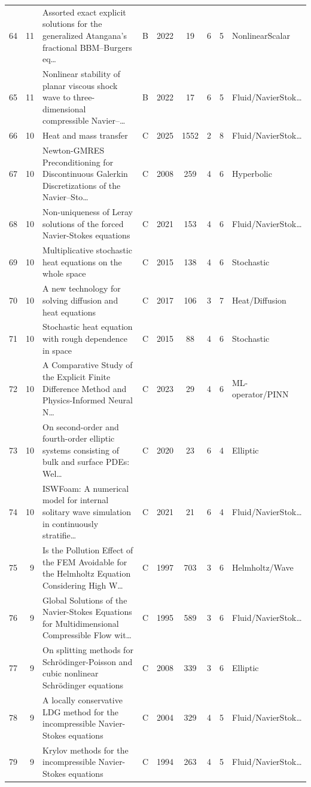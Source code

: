 \documentclass[10pt,letterpaper]{article}
\begin{document}
\begin{center}
\begin{longtable}{rrp{}cccccp{}}
64 & 11 & Assorted exact explicit solutions for the generalized Atangana’s fractional BBM–Burgers eq… & B & 2022 & 19 & 6 & 5 & NonlinearScalar \\
65 & 11 & Nonlinear stability of planar viscous shock wave to three-dimensional compressible Navier–… & B & 2022 & 17 & 6 & 5 & Fluid/NavierStok… \\
66 & 10 & Heat and mass transfer & C & 2025 & 1552 & 2 & 8 & Fluid/NavierStok… \\
67 & 10 & Newton-GMRES Preconditioning for Discontinuous Galerkin Discretizations of the Navier--Sto… & C & 2008 & 259 & 4 & 6 & Hyperbolic \\
68 & 10 & Non-uniqueness of Leray solutions of the forced Navier-Stokes equations & C & 2021 & 153 & 4 & 6 & Fluid/NavierStok… \\
69 & 10 & Multiplicative stochastic heat equations on the whole space & C & 2015 & 138 & 4 & 6 & Stochastic \\
70 & 10 & A new technology for solving diffusion and heat equations & C & 2017 & 106 & 3 & 7 & Heat/Diffusion \\
71 & 10 & Stochastic heat equation with rough dependence in space & C & 2015 & 88 & 4 & 6 & Stochastic \\
72 & 10 & A Comparative Study of the Explicit Finite Difference Method and Physics-Informed Neural N… & C & 2023 & 29 & 4 & 6 & ML-operator/PINN \\
73 & 10 & On second-order and fourth-order elliptic systems consisting of bulk and surface PDEs: Wel… & C & 2020 & 23 & 6 & 4 & Elliptic \\
74 & 10 & ISWFoam: A numerical model for internal solitary wave simulation in continuously stratifie… & C & 2021 & 21 & 6 & 4 & Fluid/NavierStok… \\
75 & 9 & Is the Pollution Effect of the FEM Avoidable for the Helmholtz Equation Considering High W… & C & 1997 & 703 & 3 & 6 & Helmholtz/Wave \\
76 & 9 & Global Solutions of the Navier-Stokes Equations for Multidimensional Compressible Flow wit… & C & 1995 & 589 & 3 & 6 & Fluid/NavierStok… \\
77 & 9 & On splitting methods for Schrödinger-Poisson and cubic nonlinear Schrödinger equations & C & 2008 & 339 & 3 & 6 & Elliptic \\
78 & 9 & A locally conservative LDG method for the incompressible Navier-Stokes equations & C & 2004 & 329 & 4 & 5 & Fluid/NavierStok… \\
79 & 9 & Krylov methods for the incompressible Navier-Stokes equations & C & 1994 & 263 & 4 & 5 & Fluid/NavierStok… \\

\end{longtable}
\end{center}
\end{document}
